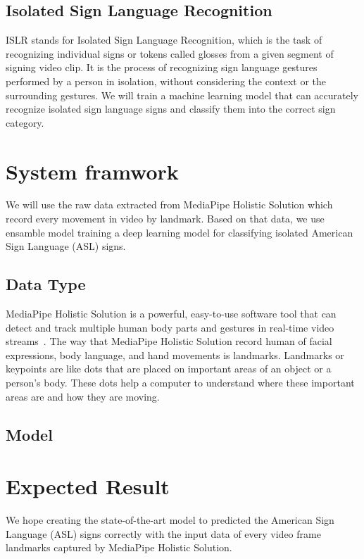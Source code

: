 \documentclass[10pt,twocolumn,letterpaper]{article}
\begin{document}
\begin{CJK*}{UTF8}{bsmi}
\subsection{Isolated Sign Language Recognition}

ISLR stands for Isolated Sign Language Recognition, which is the task of recognizing individual signs or tokens called glosses from a given segment of signing video clip.
It is the process of recognizing sign language gestures performed by a person in isolation, 
without considering the context or the surrounding gestures. 
We will train a machine learning model that can accurately recognize isolated sign language signs and classify them into the correct sign category.

\section{System framwork}
\label{sec:formatting}

We will use the raw data extracted from MediaPipe Holistic Solution which record every movement in video by landmark.
Based on that data, we use ensamble model training a deep learning model for classifying isolated American Sign Language (ASL) signs.

\subsection{Data Type}

MediaPipe Holistic Solution is a powerful, easy-to-use software tool that can detect and track multiple human body parts and gestures in real-time video streams~\cite{https://doi.org/10.48550/arxiv.1906.08172}. 
The way that MediaPipe Holistic Solution record human of facial expressions, body language, and hand movements is landmarks.
Landmarks or keypoints are like dots that are placed on important areas of an object or a person's body. 
These dots help a computer to understand where these important areas are and how they are moving.

\subsection{Model}

\section{Expected Result}
We hope creating the state-of-the-art model to predicted the American Sign Language (ASL) signs correctly
with the input data of every video frame landmarks captured by MediaPipe Holistic Solution.




{\small


}

\end{CJK*}
\end{document}
